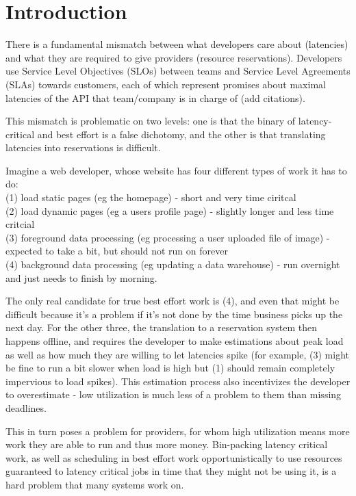 \section{Introduction}

There is a fundamental mismatch between what developers care about (latencies)
and what they are required to give providers (resource reservations). Developers
use Service Level Objectives (SLOs) between teams and Service Level Agreements
(SLAs) towards customers, each of which represent promises about maximal latencies
of the API that team/company is in charge of (add citations). 

This mismatch is problematic on two levels: one is that the binary of
latency-critical and best effort is a false dichotomy, and the other is that
translating latencies into reservations is difficult. 

Imagine a web developer, whose website has four different types of work it has
to do: \\
(1) load static pages (eg the homepage) - short and very time ciritcal \\
(2) load dynamic pages (eg a users profile page) - slightly longer and less time
critcial \\
(3) foreground data processing (eg processing a user uploaded file of image) -
expected to take a bit, but should not run on forever \\
(4) background data processing (eg updating a data warehouse) - run overnight
and just needs to finish by morning.

The only real candidate for true best effort work is (4), and even that might be
difficult because it's a problem if it's not done by the time business picks up
the next day. For the other three, the translation to a reservation system then
happens offline, and requires the developer to make estimations about peak load
as well as how much they are willing to let latencies spike (for example, (3)
might be fine to run a bit slower when load is high but (1) should remain
completely impervious to load spikes). This estimation process also incentivizes
the developer to overestimate - low utilization is much less of a problem to them than
missing deadlines. 

This in turn poses a problem for providers, for whom high utilization means more
work they are able to run and thus more money. Bin-packing latency critical
work, as well as scheduling in best effort work opportunistically to use
resources guaranteed to latency critical jobs in time that they might not be
using it, is a hard problem that many systems work on.

